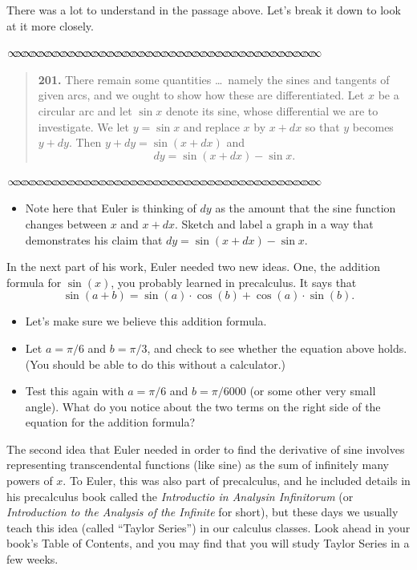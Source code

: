 \documentclass[11pt]{article}
\newcommand{\sep}{\vspace{-3pt}
\begin{center}
{\mathversion{normal}
$\infty \mspace{-5.5mu}\infty \mspace{-5.5mu}\infty \mspace{-5.5mu}\infty \mspace{-5.5mu}
\infty \mspace{-5.5mu}\infty \mspace{-5.5mu}\infty \mspace{-5.5mu}\infty \mspace{-5.5mu}
\infty \mspace{-5.5mu}\infty \mspace{-5.5mu}\infty \mspace{-5.5mu}\infty \mspace{-5.5mu}
\infty \mspace{-5.5mu}\infty \mspace{-5.5mu}\infty \mspace{-5.5mu}\infty \mspace{-5.5mu}
\infty \mspace{-5.5mu}\infty \mspace{-5.5mu}\infty \mspace{-5.5mu}\infty \mspace{-5.5mu}
\infty \mspace{-5.5mu}\infty \mspace{-5.5mu}\infty \mspace{-5.5mu}\infty \mspace{-5.5mu}
\infty \mspace{-5.5mu}\infty \mspace{-5.5mu}\infty \mspace{-5.5mu}\infty \mspace{-5.5mu}
\infty \mspace{-5.5mu}\infty \mspace{-5.5mu}\infty \mspace{-5.5mu}\infty \mspace{-5.5mu}
\infty \mspace{-5.5mu}\infty \mspace{-5.5mu}\infty \mspace{-5.5mu}\infty \mspace{-5.5mu}
\infty \mspace{-5.5mu}\infty \mspace{-5.5mu}\infty \mspace{-5.5mu}\infty \mspace{-5.5mu}$}
\end{center} \vspace*{-5pt}}
\newenvironment{source}%
 {\bigskip \sep \vspace*{-6pt} \begin{quote}
          \begin{sf}   }
   {   \end{sf}     \end{quote} \vspace*{-6pt} \sep \bigskip}%
\newcounter{tasknumb}
\newcommand{\tasknumb}{\stepcounter{tasknumb}\textmd{\textbf{$\fbox{$\fbox{Task \thetasknumb}$}$}}}
\newenvironment{task}%
 {\begin{itemize}
 \item[\tasknumb]  }
{
    \end{itemize}    }%
\begin{document}
\bigskip

There was a lot to understand in the passage above.  Let's break it down to look at it more closely.



\begin{source}
\vspace*{-6pt}
\textbf{201.} There remain some quantities \ldots~namely the sines and tangents of given arcs, and we ought to show how these are differentiated. Let $x$ be a circular arc and let $\sin x$ denote its sine, whose differential we are to investigate.  We let $y= \sin x$ and replace $x$ by $x + dx$ so that $y$ becomes $y + dy$.  Then $y + dy = \sin(x + dx)$ and
$$
dy = \sin(x + dx) - \sin x.
$$

\vspace*{-18pt}
\end{source}


\begin{task}
Note here that Euler is thinking of $dy$ as the amount that the sine function changes between $x$ and $x + dx$.  Sketch and label a graph in a way that demonstrates his claim that $dy = \sin(x + dx) - \sin x$. 
\end{task}

In the next part of his work, Euler needed two new ideas.  One, the addition formula for $\sin(x)$, you probably learned in precalculus.  It says that
$$\sin(a + b) = \sin(a) \cdot \cos(b) + \cos(a) \cdot \sin(b).$$

\begin{task} Let's make sure we believe this addition formula.
\item[(a)]  Let $a = \pi/6$ and $b = \pi/3$, and check to see whether the equation above holds.  (You should be able to do this without a calculator.)
\item[(b)] Test this again with $a= \pi/6$ and $b= \pi/6000$ (or some other very small angle).  What do you notice about the two terms on the right side of the equation for the addition formula?
\end{task}

The second idea that Euler needed in order to find the derivative of sine involves representing transcendental functions (like sine) as the sum of infinitely many powers of $x$.  To Euler, this was also part of precalculus, and he included details in his precalculus book called the \emph{Introductio in Analysin Infinitorum} (or  \emph{Introduction to the Analysis of the Infinite} for short),  but these days we usually teach this idea (called ``Taylor Series'')  in our calculus classes.  Look ahead in your book's Table of Contents, and you may find that you will study Taylor Series in a few weeks.
\end{document}
